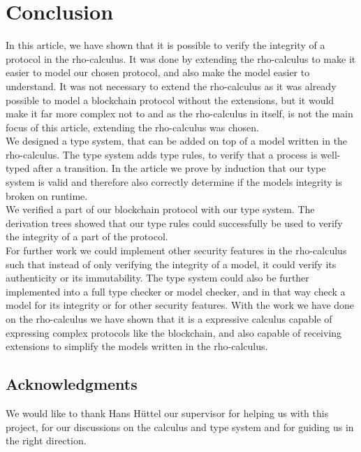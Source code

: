 \section{Conclusion}
In this article, we have shown that it is possible to verify the integrity of a protocol in the rho-calculus. It was done by extending the rho-calculus to make it easier to model our chosen protocol, and also make the model easier to understand. It was not necessary to extend the rho-calculus as it was already possible to model a blockchain protocol without the extensions, but it would make it far more complex not to and as the rho-calculus in itself, is not the main focus of this article, extending the rho-calculus was chosen.\\
We designed a type system, that can be added on top of a model written in the rho-calculus. The type system adds type rules, to verify that a process is well-typed after a transition. In the article we prove by induction that our type system is valid and therefore also correctly determine if the models integrity is broken on runtime.\\
We verified a part of our blockchain protocol with our type system. The derivation trees showed that our type rules could successfully be used to verify the integrity of a part of the protocol.\\

For further work we could implement other security features in the rho-calculus such that instead of only verifying the integrity of a model, it could verify its authenticity or its immutability. The type system could also be further implemented into a full type checker or model checker, and in that way check a model for its integrity or for other security features. With the work we have done on the rho-calculus we have shown that it is a expressive calculus capable of expressing complex protocols like the blockchain, and also capable of receiving extensions to simplify the models written in the rho-calculus.


\subsection*{Acknowledgments}
We would like to thank Hans Hüttel our supervisor for helping us with this project, for our discussions on the calculus and type system and for guiding us in the right direction.
